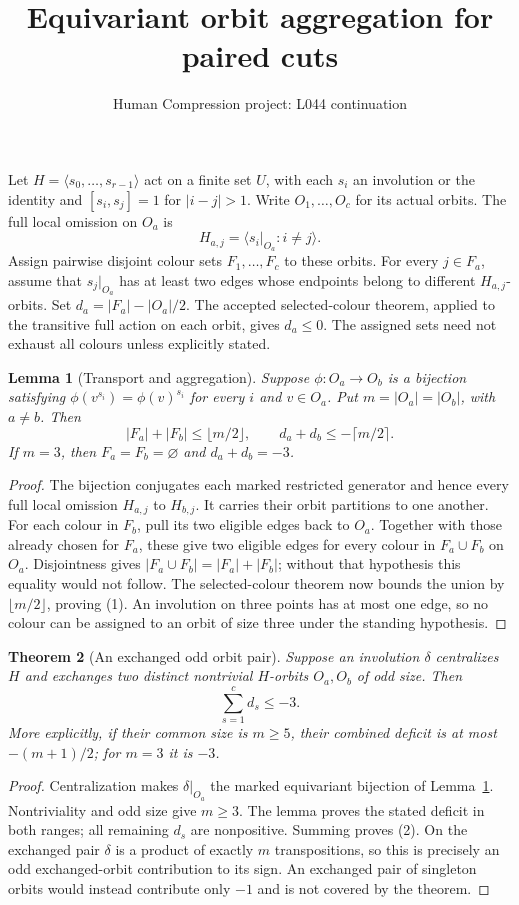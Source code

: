 \documentclass[11pt,a4paper]{article}
\title{Equivariant orbit aggregation for paired cuts}
\author{Human Compression project: L044 continuation}
\date{}
\newtheorem{lemma}{Lemma}
\newtheorem{theorem}[lemma]{Theorem}
\newcommand{\gen}[1]{\langle#1\rangle}
\begin{document}
\maketitle
Let $H=\gen{s_0,\ldots,s_{r-1}}$ act on a finite set $U$, with
each $s_i$ an involution or the identity and $[s_i,s_j]=1$ for
$|i-j|>1$. Write $O_1,\ldots,O_c$ for its actual orbits.
The full local omission on $O_a$ is
\[
 H_{a,j}=\gen{s_i|_{O_a}:i\ne j}.
\]
Assign pairwise disjoint colour sets $F_1,\ldots,F_c$ to these
orbits. For every $j\in F_a$, assume that $s_j|_{O_a}$ has at
least two edges whose endpoints belong to different $H_{a,j}$-orbits.
Set $d_a=|F_a|-|O_a|/2$. The accepted selected-colour theorem,
applied to the transitive full action on each orbit, gives $d_a\le0$.
The assigned sets need not exhaust all colours unless explicitly stated.

\begin{lemma}[Transport and aggregation]\label{transport}
Suppose $\phi:O_a\longrightarrow O_b$ is a bijection satisfying
$\phi(v^{s_i})=\phi(v)^{s_i}$ for every $i$ and $v\in O_a$.
Put $m=|O_a|=|O_b|$, with $a\ne b$. Then
\[
 |F_a|+|F_b|\le\lfloor m/2\rfloor,
 \qquad d_a+d_b\le-\lceil m/2\rceil.                 \tag{1}
\]
If $m=3$, then $F_a=F_b=\varnothing$ and $d_a+d_b=-3$.
\end{lemma}
\begin{proof}
The bijection conjugates each marked restricted generator and hence
every full local omission $H_{a,j}$ to $H_{b,j}$. It carries their
orbit partitions to one another. For each colour in $F_b$, pull its
two eligible edges back to $O_a$. Together with those already chosen
for $F_a$, these give two eligible edges for every colour in
$F_a\cup F_b$ on $O_a$. Disjointness gives
$|F_a\cup F_b|=|F_a|+|F_b|$; without that hypothesis this equality
would not follow. The selected-colour theorem now bounds the union
by $\lfloor m/2\rfloor$, proving (1).
An involution on three points has at most one edge, so no colour can
be assigned to an orbit of size three under the standing hypothesis.
\end{proof}

\begin{theorem}[An exchanged odd orbit pair]\label{odd}
Suppose an involution $\delta$ centralizes $H$ and exchanges two
distinct nontrivial $H$-orbits $O_a,O_b$ of odd size. Then
\[
                         \sum_{s=1}^c d_s\le-3.       \tag{2}
\]
More explicitly, if their common size is $m\ge5$, their combined
deficit is at most $-(m+1)/2$; for $m=3$ it is $-3$.
\end{theorem}
\begin{proof}
Centralization makes $\delta|_{O_a}$ the marked equivariant
bijection of Lemma~\ref{transport}. Nontriviality and odd size
give $m\ge3$. The lemma proves the stated deficit in both ranges;
all remaining $d_s$ are nonpositive. Summing proves (2).
On the exchanged pair $\delta$ is a product of exactly $m$
transpositions, so this is precisely an odd exchanged-orbit
contribution to its sign. An exchanged pair of singleton orbits
would instead contribute only $-1$ and is not covered by the theorem.
\end{proof}
\end{document}
